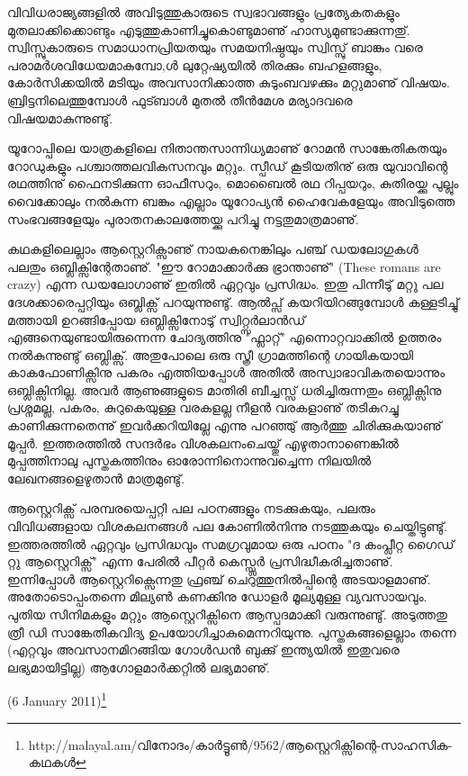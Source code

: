 വിവിധരാജ്യങ്ങളില്‍ അവിടുത്തുകാരുടെ സ്വഭാവങ്ങളും പ്രത്യേകതകളും മുതലാക്കിക്കൊണ്ടും എടുത്തുകാണിച്ചുകൊണ്ടുമാണു് 
ഹാസ്യമുണ്ടാക്കുന്നതു്. സ്വിസ്സുകാരുടെ സമാധാനപ്രിയതയും സമയനിഷ്ഠയും സ്വിസ്സു് ബാങ്കും 
വരെ പരാമര്‍ശവിധേയമാകുമ്പോ,ള്‍ ലുറ്റേഷ്യയില്‍ തിരക്കും ബഹളങ്ങളും, കോര്‍സിക്കയില്‍ മടിയും അവസാനിക്കാത്ത 
കുടുംബവഴക്കും മറ്റുമാണു് വിഷയം. ബ്രിട്ടനിലെത്തുമ്പോള്‍ ഫുട്ബാള്‍ മുതല്‍ തീന്‍മേശ മര്യാദവരെ വിഷയമാകുന്നുണ്ടു്.

യൂറോപ്പിലെ യാത്രകളിലെ നിതാന്തസാന്നിധ്യമാണു് റോമന്‍ സാങ്കേതികതയും റോഡുകളും പശ്ചാത്തലവികസനവും മറ്റും. 
സ്പീഡ് കൂടിയതിനു് ഒരു യുവാവിന്റെ രഥത്തിനു് ഫൈനടിക്കുന്ന ഓഫീസറും, മൊബൈല്‍ രഥ റിപ്പയറും, കുതിരയ്ക്കു പുല്ലും 
വൈക്കോലും നല്‍കുന്ന ബങ്കും എല്ലാം യൂറോപ്യന്‍ ഹൈവേകളേയും അവിടുത്തെ സംഭവങ്ങളേയും പുരാതനകാലത്തേയ്ക്കു 
പറിച്ചു നട്ടതുമാത്രമാണു്.

കഥകളിലെല്ലാം ആസ്റ്റെറിക്സാണു് നായകനെങ്കിലും പഞ്ച് ഡയലോഗുകള്‍ പലതും ഒബ്ലിക്സിന്റേതാണു്. "ഈ റോമാക്കാര്‍ക്കു 
ഭ്രാന്താണു്" (These romans are crazy) എന്ന ഡയലോഗാണു് ഇതില്‍ ഏറ്റവും പ്രസിദ്ധം. ഇതു പിന്നീടു് മറ്റു പല 
ദേശക്കാരെപ്പറ്റിയും ഒബ്ലിക്സ് പറയുന്നുണ്ടു്. ആല്‍പ്സ് കയറിയിറങ്ങുമ്പോള്‍ കള്ളടിച്ചു് മത്തായി ഉറങ്ങിപ്പോയ 
ഒബ്ലിക്സിനോടു് സ്വിറ്റ്സര്‍ലാന്‍ഡ് എങ്ങനെയുണ്ടായിരുന്നെന്ന ചോദ്യത്തിനു "ഫ്ലാറ്റ്" എന്നൊറ്റവാക്കില്‍ ഉത്തരം 
നല്‍കുന്നുണ്ടു് ഒബ്ലിക്സ്. അതുപോലെ ഒരു സ്ത്രീ ഗ്രാമത്തിന്റെ ഗായികയായി കാകഫോണിക്സിനു പകരം എത്തിയപ്പോള്‍ 
അതില്‍ അസ്വാഭാവികതയൊന്നും ഒബ്ലിക്സിനില്ല. അവര്‍ ആണുങ്ങളുടെ മാതിരി ബീച്ചസ്സ് ധരിച്ചിരുന്നതും ഒബ്ലിക്സിനു 
പ്രശ്നമല്ല, പകരം, കുറുകെയുള്ള വരകളല്ല നീളന്‍ വരകളാണു് തടികുറച്ചു കാണിക്കുന്നതെന്നു് ഇവര്‍ക്കറിയില്ലേ എന്നു 
പറഞ്ഞു് ആര്‍ത്തു ചിരിക്കുകയാണു് മൂപ്പര്‍. ഇത്തരത്തില്‍ സന്ദര്‍ഭം വിശകലനംചെയ്തു് എഴുതാനാണെങ്കില്‍ മുപ്പത്തിനാലു 
പുസ്തകത്തിനും ഓരോന്നിനൊന്നുവച്ചെന്ന നിലയില്‍ ലേഖനങ്ങളെഴുതാന്‍ മാത്രമുണ്ടു്.

ആസ്റ്റെറിക്സ് പരമ്പരയെപ്പറ്റി പല പഠനങ്ങളും നടക്കുകയും, പലരും വിവിധങ്ങളായ വിശകലനങ്ങള്‍ പല കോണില്‍നിന്നു
നടത്തുകയും ചെയ്തിട്ടുണ്ടു്. ഇത്തരത്തില്‍ ഏറ്റവും പ്രസിദ്ധവും സമഗ്രവുമായ ഒരു പഠനം "ദ കംപ്ലീറ്റ ഗൈഡ് റ്റു ആസ്റ്റെറിക്സ്"
എന്ന പേരില്‍ പീറ്റര്‍ കെസ്സ്ലര്‍ പ്രസിദ്ധീകരിച്ചതാണു്. ഇന്നിപ്പോള്‍ ആസ്റ്റെറിക്സെന്നതു ഫ്രഞ്ച് ചെറുത്തുനില്‍പ്പിന്റെ 
അടയാളമാണു്. അതോടൊപ്പംതന്നെ മില്യണ്‍ കണക്കിനു ഡോളര്‍ മൂല്യമുള്ള വ്യവസായവും. പുതിയ സിനിമകളും മറ്റും
ആസ്റ്റെറിക്സിനെ ആസ്പദമാക്കി വരുന്നുണ്ടു്. അടുത്തതു ത്രീ ഡി സാങ്കേതികവിദ്യ ഉപയോഗിച്ചാകുമെന്നറിയുന്നു. 
പുസ്തകങ്ങളെല്ലാം തന്നെ (എറ്റവും അവസാനമിറങ്ങിയ ഗോള്‍ഡന്‍ ബുക്കു് ഇന്ത്യയില്‍ ഇതുവരെ ലഭ്യമായിട്ടില്ല) 
ആഗോളമാര്‍ക്കറ്റില്‍ ലഭ്യമാണു്.

(6 January 2011)\footnote{http://malayal.am/വിനോദം/കാര്‍ട്ടൂണ്‍/9562/ആസ്റ്റെറിക്സിന്റെ-സാഹസിക-കഥകള്‍}

\newpage
